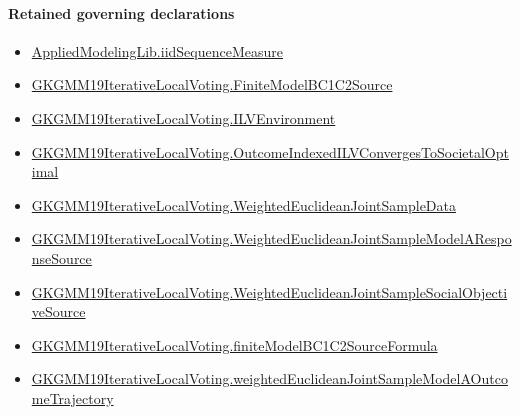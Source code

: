 \documentclass[10pt]{article}
\begin{document}
\paragraph{Retained governing declarations}
\begin{itemize}\raggedright
\item \hyperlink{governing-declaration-f1b1ee19fc287ae5}{Applied\allowbreak{}Modeling\allowbreak{}Lib.\allowbreak{}iid\allowbreak{}Sequence\allowbreak{}Measure}
\item \hyperlink{governing-declaration-b2172f203bb89b25}{GKGMM19\allowbreak{}Iterative\allowbreak{}Local\allowbreak{}Voting.\allowbreak{}Finite\allowbreak{}Model\allowbreak{}BC1\allowbreak{}C2\allowbreak{}Source}
\item \hyperlink{governing-declaration-df2ca62df1846667}{GKGMM19\allowbreak{}Iterative\allowbreak{}Local\allowbreak{}Voting.\allowbreak{}ILV\allowbreak{}Environment}
\item \hyperlink{governing-declaration-3e297ee911a81a7e}{GKGMM19\allowbreak{}Iterative\allowbreak{}Local\allowbreak{}Voting.\allowbreak{}Outcome\allowbreak{}Indexed\allowbreak{}ILV\allowbreak{}Converges\allowbreak{}To\allowbreak{}Societal\allowbreak{}Optimal}
\item \hyperlink{governing-declaration-b9220a54a8f8ff22}{GKGMM19\allowbreak{}Iterative\allowbreak{}Local\allowbreak{}Voting.\allowbreak{}Weighted\allowbreak{}Euclidean\allowbreak{}Joint\allowbreak{}Sample\allowbreak{}Data}
\item \hyperlink{governing-declaration-8559d608aec9f691}{GKGMM19\allowbreak{}Iterative\allowbreak{}Local\allowbreak{}Voting.\allowbreak{}Weighted\allowbreak{}Euclidean\allowbreak{}Joint\allowbreak{}Sample\allowbreak{}Model\allowbreak{}A\allowbreak{}Response\allowbreak{}Source}
\item \hyperlink{governing-declaration-a4f8d5a0e9a7a494}{GKGMM19\allowbreak{}Iterative\allowbreak{}Local\allowbreak{}Voting.\allowbreak{}Weighted\allowbreak{}Euclidean\allowbreak{}Joint\allowbreak{}Sample\allowbreak{}Social\allowbreak{}Objective\allowbreak{}Source}
\item \hyperlink{governing-declaration-e2a0dd5d6886b3ec}{GKGMM19\allowbreak{}Iterative\allowbreak{}Local\allowbreak{}Voting.\allowbreak{}finite\allowbreak{}Model\allowbreak{}BC1\allowbreak{}C2\allowbreak{}Source\allowbreak{}Formula}
\item \hyperlink{governing-declaration-68cc7fb40a11cfdb}{GKGMM19\allowbreak{}Iterative\allowbreak{}Local\allowbreak{}Voting.\allowbreak{}weighted\allowbreak{}Euclidean\allowbreak{}Joint\allowbreak{}Sample\allowbreak{}Model\allowbreak{}A\allowbreak{}Outcome\allowbreak{}Trajectory}

\end{itemize}
\end{document}
